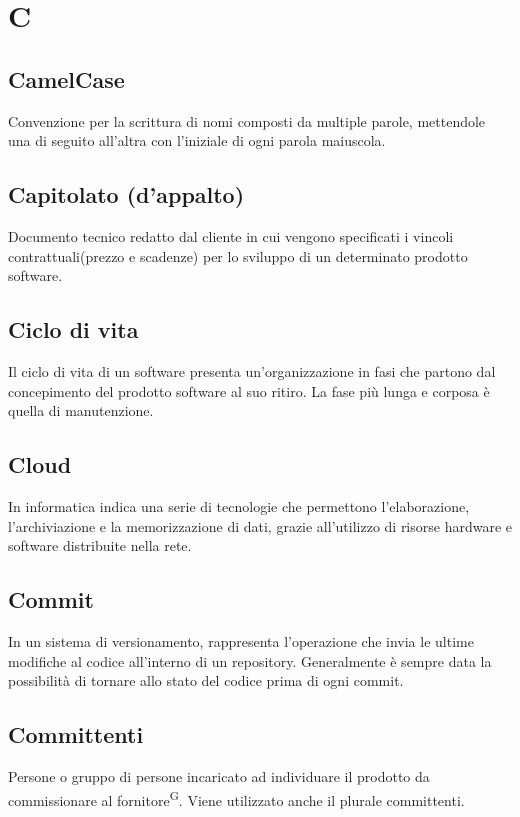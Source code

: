 \section{C}

\subsection{CamelCase}
Convenzione per la scrittura di nomi composti da multiple parole, mettendole una di seguito all'altra con l'iniziale di ogni parola maiuscola. 

\subsection{Capitolato (d'appalto)}
Documento tecnico redatto dal cliente in cui vengono specificati i vincoli contrattuali(prezzo e scadenze) per lo sviluppo di un determinato prodotto software.

\subsection{Ciclo di vita}
Il ciclo di vita di un software presenta un'organizzazione in fasi che partono dal concepimento del prodotto software al suo ritiro. La fase più lunga e corposa è quella di manutenzione.

\subsection{Cloud}
In informatica indica una serie di tecnologie che permettono l’elaborazione, l’archiviazione e la memorizzazione di dati, grazie all’utilizzo di risorse hardware e software distribuite nella rete.

\subsection{Commit}
In un sistema di versionamento, rappresenta l'operazione che invia le ultime modifiche al codice all'interno di un repository. Generalmente è sempre data la possibilità di tornare allo stato del codice prima di ogni commit.


\subsection{Committenti}
Persone o gruppo di persone incaricato ad individuare il prodotto da commissionare al fornitore\textsuperscript{G}. Viene utilizzato anche il plurale committenti.


